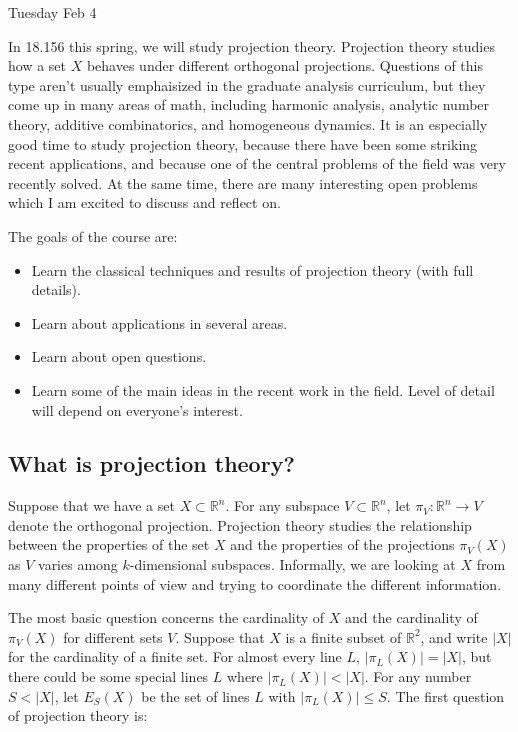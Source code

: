 \documentclass[12pt]{amsart}
\newcommand{\RR}{\mathbb{R}}
\begin{document}
Tuesday Feb 4

In 18.156 this spring,  we will study projection theory.   Projection theory studies how a set $X$ behaves under different orthogonal projections.    Questions of this type aren't usually emphaisized in the graduate analysis curriculum,  but they come up in many areas of math,  including harmonic analysis,  analytic number theory,  additive combinatorics,  and homogeneous dynamics.   It is an especially good time to study projection theory,  because there have been some striking recent applications,  and because one of the central problems of the field was very recently solved.   At the same time,  there are many interesting open problems which I am excited to discuss and reflect on.

The goals of the course are:

\begin{itemize}

\item Learn the classical techniques and results of projection theory (with full details).

\item Learn about applications in several areas.

\item Learn about open questions.

\item Learn some of the main ideas in the recent work in the field.   Level of detail will depend on everyone's interest.

\end{itemize}


\subsection{What is projection theory?}

Suppose that we have a set $X \subset \RR^n$.   For any subspace $V \subset \RR^n$,  let $\pi_V: \RR^n \rightarrow V$ denote the orthogonal projection.   Projection theory studies the relationship between the properties of the set $X$ and the properties of the projections $\pi_V(X)$ as $V$ varies among $k$-dimensional subspaces.  Informally, we are looking at $X$ from many different points of view and trying to coordinate the different information.

The most basic question concerns the cardinality of $X$ and the cardinality of $\pi_V(X)$ for different sets $V$.   Suppose that $X$ is a finite subset of $\RR^2$, and write $|X|$ for the cardinality of a finite set.   For almost every line $L$,  $|\pi_L(X)| = |X|$,  but there could be some special lines $L$ where $|\pi_L(X)| < |X|$.   For any number $S < |X|$,  let $E_S(X)$ be the set of lines $L$ with $|\pi_L(X)| \le S$.   The first question of projection theory is: 
\end{document}
